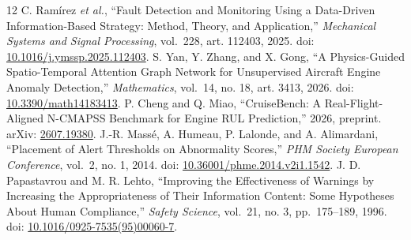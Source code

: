 \documentclass[10pt,twocolumn]{article}
\begin{document}
\begin{thebibliography}{12}
 C. Ramírez \emph{et al.}, ``Fault Detection and Monitoring Using a Data-Driven Information-Based Strategy: Method, Theory, and Application,'' \emph{Mechanical Systems and Signal Processing}, vol.~228, art. 112403, 2025. doi: \href{https://doi.org/10.1016/j.ymssp.2025.112403}{10.1016/j.ymssp.2025.112403}.
 S. Yan, Y. Zhang, and X. Gong, ``A Physics-Guided Spatio-Temporal Attention Graph Network for Unsupervised Aircraft Engine Anomaly Detection,'' \emph{Mathematics}, vol.~14, no. 18, art. 3413, 2026. doi: \href{https://doi.org/10.3390/math14183413}{10.3390/math14183413}.
 P. Cheng and Q. Miao, ``CruiseBench: A Real-Flight-Aligned N-CMAPSS Benchmark for Engine RUL Prediction,'' 2026, preprint. arXiv: \href{https://arxiv.org/abs/2607.19380}{2607.19380}.
 J.-R. Massé, A. Humeau, P. Lalonde, and A. Alimardani, ``Placement of Alert Thresholds on Abnormality Scores,'' \emph{PHM Society European Conference}, vol.~2, no. 1, 2014. doi: \href{https://doi.org/10.36001/phme.2014.v2i1.1542}{10.36001/phme.2014.v2i1.1542}.
 J. D. Papastavrou and M. R. Lehto, ``Improving the Effectiveness of Warnings by Increasing the Appropriateness of Their Information Content: Some Hypotheses About Human Compliance,'' \emph{Safety Science}, vol.~21, no. 3, pp.~175--189, 1996. doi: \href{https://doi.org/10.1016/0925-7535(95)00060-7}{10.1016/0925-7535(95)00060-7}.
\end{thebibliography}
\end{document}

